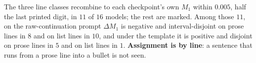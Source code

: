 The three line classes recombine to each checkpoint's own $M_1$ within $0.005$, half the last printed digit, in $11$ of $16$ models; the rest are marked. Among those $11$, on the raw-continuation prompt $\Delta M_1$ is negative and interval-disjoint on prose lines in $8$ and on list lines in $10$, and under the template it is positive and disjoint on prose lines in $5$ and on list lines in $1$. \textbf{Assignment is by line}: a sentence that runs from a prose line into a bullet is not seen.
